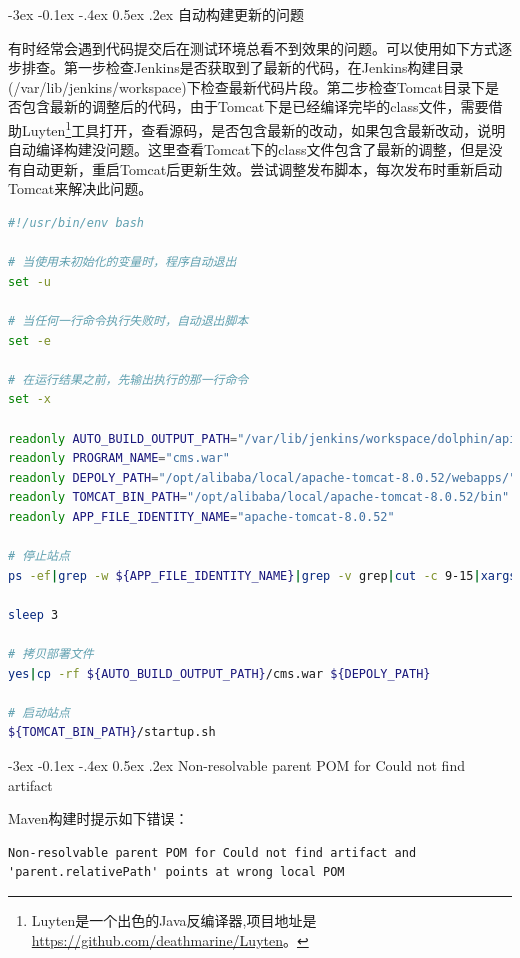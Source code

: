 \documentclass[8pt]{book}
\makeatletter
\numberwithin{dummy}{section}
\theoremstyle{ocrenumbox}
\theoremstyle{blacknumex}
\theoremstyle{blacknumbox}
\theoremstyle{ocrenum}
\renewcommand{\subsection}{\@startsection {subsection}{2}{\z@}
	{-3ex \@plus -0.1ex \@minus -.4ex}
	{0.5ex \@plus.2ex }
	{\normalfont\sffamily\bfseries}}
\makeatother
\begin{document}
\subsection{自动构建更新的问题}

有时经常会遇到代码提交后在测试环境总看不到效果的问题。可以使用如下方式逐步排查。第一步检查Jenkins是否获取到了最新的代码，在Jenkins构建目录(/var/lib/jenkins/workspace)下检查最新代码片段。第二步检查Tomcat目录下是否包含最新的调整后的代码，由于Tomcat下是已经编译完毕的class文件，需要借助Luyten\footnote{Luyten是一个出色的Java反编译器,项目地址是\url{https://github.com/deathmarine/Luyten}。}工具打开，查看源码，是否包含最新的改动，如果包含最新改动，说明自动编译构建没问题。这里查看Tomcat下的class文件包含了最新的调整，但是没有自动更新，重启Tomcat后更新生效。尝试调整发布脚本，每次发布时重新启动Tomcat来解决此问题。

\begin{lstlisting}[language=Bash]
#!/usr/bin/env bash

# 当使用未初始化的变量时，程序自动退出
set -u

# 当任何一行命令执行失败时，自动退出脚本
set -e

# 在运行结果之前，先输出执行的那一行命令
set -x

readonly AUTO_BUILD_OUTPUT_PATH="/var/lib/jenkins/workspace/dolphin/api/target"
readonly PROGRAM_NAME="cms.war"
readonly DEPOLY_PATH="/opt/alibaba/local/apache-tomcat-8.0.52/webapps/"
readonly TOMCAT_BIN_PATH="/opt/alibaba/local/apache-tomcat-8.0.52/bin"
readonly APP_FILE_IDENTITY_NAME="apache-tomcat-8.0.52"

# 停止站点
ps -ef|grep -w ${APP_FILE_IDENTITY_NAME}|grep -v grep|cut -c 9-15|xargs kill 9

sleep 3

# 拷贝部署文件
yes|cp -rf ${AUTO_BUILD_OUTPUT_PATH}/cms.war ${DEPOLY_PATH}

# 启动站点
${TOMCAT_BIN_PATH}/startup.sh
\end{lstlisting}

\subsection{Non-resolvable parent POM for Could not find artifact}

Maven构建时提示如下错误：

\begin{lstlisting}
Non-resolvable parent POM for Could not find artifact and 'parent.relativePath' points at wrong local POM
\end{lstlisting}
\end{document}
